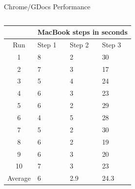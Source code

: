 \documentclass{beamer}
\begin{document}
\begin{frame}{Chrome/GDocs Performance}
  \begin{columns}
    \column{5cm}
    \resizebox{5cm}{!} {
    \begin{tabularx}{275pt}{| c | X | X | X |}
      \hline
      & \multicolumn{3}{c|}{MacBook steps in seconds} \\ \hline
      Run      & Step 1 & Step 2 & Step 3 \\ \hline
      1        & 8      & 2      & 30     \\ \hline
      2        & 7      & 3      & 17     \\ \hline
      3        & 5      & 4      & 24     \\ \hline
      4        & 6      & 3      & 23     \\ \hline
      5        & 6      & 2      & 29     \\ \hline
      6        & 4      & 5      & 28     \\ \hline
      7        & 5      & 2      & 30     \\ \hline
      8        & 6      & 2      & 19     \\ \hline
      9        & 6      & 3      & 20     \\ \hline
      10       & 7      & 3      & 23     \\ \hline
      Average  & 6      & 2.9    & 24.3   \\
      \hline
    \end{tabularx}
}
    \column{5cm}
  \end{columns}
\end{frame}
\end{document}
